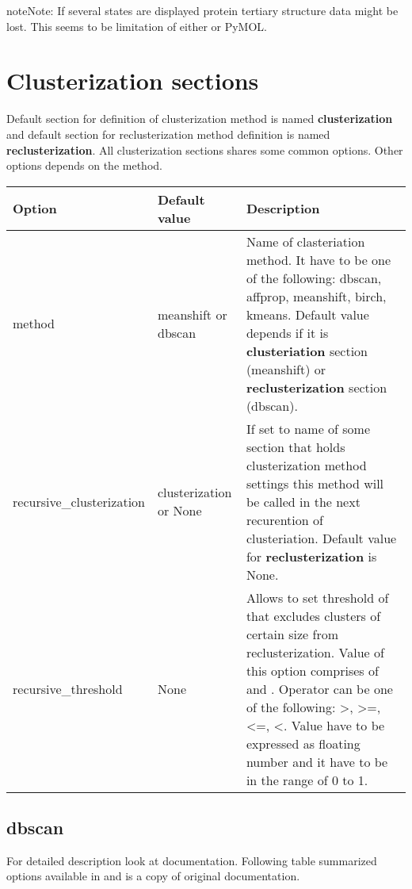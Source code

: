 \documentclass[a4paper,10pt,english]{sphinxmanual}
\begin{document}
\begin{notice}{note}{Note:}
If several states are displayed protein tertiary structure data might be lost. This seems to be limitation of either  or PyMOL.
\end{notice}


\section{Clusterization sections}
\label{valve/valve_config:clusterization-sections}
Default section for definition of clusterization method is named \textbf{clusterization} and default section for reclusterization method definition is named \textbf{reclusterization}. All clusterization sections shares some common options. Other options depends on the method.

\noindent\begin{tabulary}{\linewidth}{|L|L|L|}
\hline
\textsf{\relax 
Option
\unskip}\relax &\textsf{\relax 
Default value
\unskip}\relax &\textsf{\relax 
Description
\unskip}\relax \\
\hline
method
&
meanshift or
dbscan
&
Name of clasteriation method. It have to be one of the
following: dbscan, affprop, meanshift, birch, kmeans. Default
value depends if it is \textbf{clusteriation} section (meanshift) or
\textbf{reclusterization} section (dbscan).
\\
\hline
recursive\_clusterization
&
clusterization
or None
&
If set to name of some section that holds clusterization method
settings this method will be called in the next recurention of
clusteriation. Default value for \textbf{reclusterization} is None.
\\
\hline
recursive\_threshold
&
None
&
Allows to set threshold of that excludes clusters of certain
size from reclusterization. Value of this option comprises of
 and . Operator can be one of the following:
\textgreater{}, \textgreater{}=, \textless{}=, \textless{}. Value have to be expressed as floating number and
it have to be in the range of 0 to 1.
\\
\hline\end{tabulary}



\subsection{dbscan}
\label{valve/valve_config:dbscan}
For detailed description look at \href{http://scikit-learn.org/stable/modules/generated/sklearn.cluster.DBSCAN.html\#sklearn.cluster.DBSCAN}{} documentation. Following table summarized options available in  and is a copy of original documentation.
\end{document}
